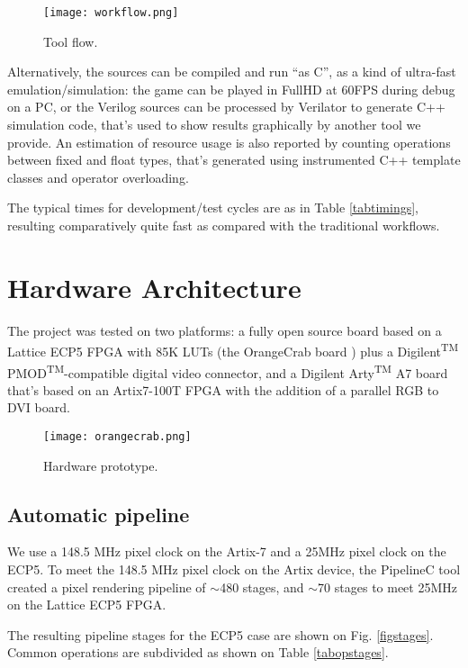 \documentclass[conference]{IEEEtran}
\begin{document}
\begin{figure}
\texttt{[image: workflow.png]}
\caption{Tool flow.}
\label{figflow}
\end{figure}


Alternatively, the sources can be compiled and run “as C”, as a kind of ultra-fast emulation/simulation: the game can be played in FullHD at 60FPS during debug on a PC, or the Verilog sources can be processed by Verilator to generate C++ simulation code, that’s used to show results graphically by another tool we provide. An estimation of resource usage is also reported by counting operations between fixed and float types, that's generated using instrumented C++ template classes and operator overloading.

The typical times for development/test cycles are as in Table \ref{tabtimings}, resulting comparatively quite fast as compared with the traditional workflows.
\\
\section{Hardware Architecture}

The project was tested on two platforms: a fully open source board based on a Lattice ECP5 FPGA with 85K LUTs (the OrangeCrab board \cite{orangecrab}) plus a Digilent\textsuperscript{TM} PMOD\textsuperscript{TM}-compatible digital video connector, and a Digilent Arty\textsuperscript{TM} A7 board that's based on an Artix7-100T FPGA with the addition of a parallel RGB to DVI board.

\begin{figure}
\texttt{[image: orangecrab.png]}
\caption{Hardware prototype.}
\label{figboard}
\end{figure}

\subsection{Automatic pipeline}

We use a 148.5 MHz pixel clock on the Artix-7 and a 25MHz pixel clock on the ECP5.
To meet the 148.5 MHz pixel clock on the Artix device, the PipelineC tool created a pixel rendering pipeline of $\sim$480 stages, and $\sim$70 stages to meet 25MHz on the Lattice ECP5 FPGA.

The resulting pipeline stages for the ECP5 case are shown on Fig. \ref{figstages}. Common operations are subdivided as shown on Table \ref{tabopstages}.
\end{document}
